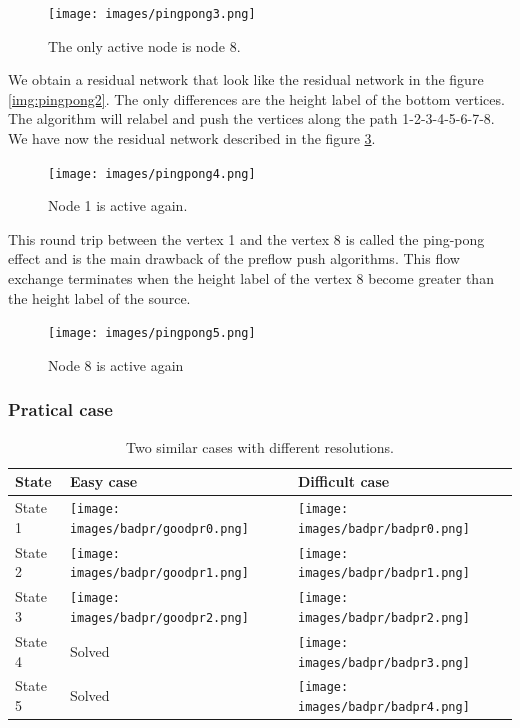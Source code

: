 \begin{figure}[H]
\centering
\texttt{[image: images/pingpong3.png]}
\caption{The only active node is node 8.}
\label{img:pingpong3}
\end{figure}

We obtain a residual network that look like the residual network in the figure \ref{img:pingpong2}. The only differences are the height label of the bottom vertices. The algorithm will relabel and push the vertices along the path 1-2-3-4-5-6-7-8. We have now the residual network described in the figure \ref{img:pingpong5}.
\begin{figure}[H]
\centering
\texttt{[image: images/pingpong4.png]}
\caption{Node 1 is active again.}
\label{img:pingpong4}
\end{figure}

This round trip between the vertex 1 and the vertex 8 is called the ping-pong effect and is the main drawback of the preflow push algorithms. This flow exchange terminates when the height label of the vertex 8 become greater than the height label of the source.


\begin{figure}[H]
\centering
\texttt{[image: images/pingpong5.png]}
\caption{Node 8 is active again}
\label{img:pingpong5}
\end{figure}


\subsubsection{Pratical case}

\begin{table}
\begin{tabular}{|D|C|C|}
   \hline
   State & 
   Easy case & 
   Difficult case \\ \hline
   State 1 &
   \texttt{[image: images/badpr/goodpr0.png]} & 
   \texttt{[image: images/badpr/badpr0.png]} \\
   State 2 &
   \texttt{[image: images/badpr/goodpr1.png]} & 
   \texttt{[image: images/badpr/badpr1.png]} \\
   State 3 &
   \texttt{[image: images/badpr/goodpr2.png]} & 
   \texttt{[image: images/badpr/badpr2.png]} \\
   State 4 &
   Solved & 
   \texttt{[image: images/badpr/badpr3.png]} \\
   State 5 &
   Solved & 
   \texttt{[image: images/badpr/badpr4.png]} \\ 
   \hline
\end{tabular}
\caption{Two similar cases with different resolutions.}
\label{tabl:case}
\end{table}

